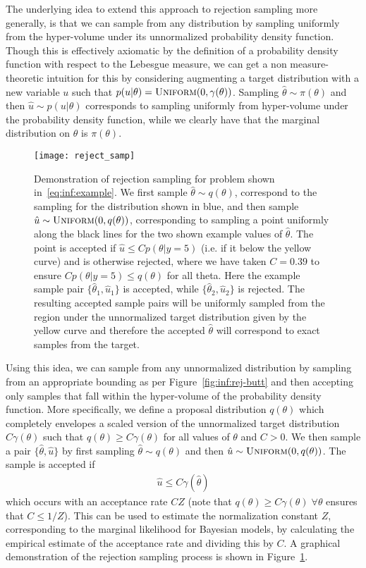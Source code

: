 The underlying idea to extend this approach to rejection sampling more generally, is that we can sample from any distribution
by sampling uniformly from the hyper-volume under its unnormalized probability density function.
Though this is effectively axiomatic by the definition of a probability density
function with respect to the Lebesgue measure, we can get a non measure-theoretic
intuition for this by considering augmenting a target distribution with a new variable $u$
such that $p(u|\theta) = \textsc{Uniform}(0,\gamma(\theta))$.  Sampling 
$\hat{\theta} \sim \pi(\theta)$ and then $\hat{u}\sim p(u|\theta)$ corresponds to
sampling uniformly from hyper-volume under the probability density function, while we
clearly have that the marginal distribution on $\theta$ is $\pi(\theta)$.

\begin{figure}[t]
	\centering
	\texttt{[image: reject\_samp]}
	\caption{Demonstration of rejection sampling for problem shown in~\eqref{eq:inf:example}.  
		We first sample $\hat{\theta}\sim q(\theta)$, correspond to the sampling for the distribution
		shown in blue,
		and then sample $\hat{u}\sim \textsc{Uniform}(0,q(\theta))$, corresponding to
		sampling a point uniformly along the black lines for the two shown example values of 
		$\hat{\theta}$.  The point is accepted 
		if $\hat{u} \le C p(\theta | y=5)$ (i.e. if it below the yellow curve) and is 
		otherwise rejected, where we have taken
		$C=0.39$ to ensure $C p(\theta | y=5)\le q(\theta)$ for all theta.
		Here the example sample pair $\{\hat{\theta}_1,\hat{u}_1\}$ is accepted, while
		$\{\hat{\theta}_2,\hat{u}_2\}$ is rejected.  The
		resulting accepted sample pairs will be uniformly sampled from the region under
		the unnormalized target distribution given by the yellow curve and therefore
		the accepted $\hat{\theta}$ will correspond to exact samples from the target.
		 \label{fig:inf:rej-samp}}
\end{figure}

Using this idea, we can sample from any unnormalized distribution by sampling from
an appropriate bounding as per Figure~\ref{fig:inf:rej-butt} and then accepting only samples
that fall within the hyper-volume of the probability density function. 
More specifically, we define a proposal
distribution $q(\theta)$ which completely envelopes a
scaled version of the unnormalized target distribution $C\gamma(\theta)$ such that 
$q(\theta)\ge C \gamma(\theta)$ for all values of $\theta$ and $C>0$.  We then sample a pair 
$\{\hat{\theta},\hat{u}\}$ by first sampling $\hat{\theta} \sim q(\theta)$ and then
$\hat{u} \sim \textsc{Uniform}(0,q(\theta))$.  The sample is accepted if
\begin{align}
	\label{eq:inf:rej-acc-criteria}
	\hat{u} \le C \gamma(\hat{\theta})
\end{align}
which occurs with an acceptance rate $CZ$ (note that $q(\theta)\ge C \gamma(\theta) \; \forall \theta$
ensures that $C \le 1/Z$).  This can be used to estimate the normalization
constant $Z$, corresponding to the marginal likelihood for Bayesian models, by calculating
the empirical estimate of the acceptance rate and dividing this by $C$.
A graphical demonstration of the rejection sampling process is shown in 
Figure~\ref{fig:inf:rej-samp}.

